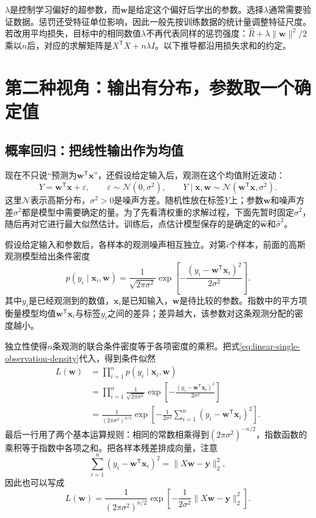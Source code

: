 $\lambda$是控制学习偏好的超参数，而$\bm w$是给定这个偏好后学出的参数。选择$\lambda$通常需要验证数据。惩罚还受特征单位影响，因此一般先按训练数据的统计量调整特征尺度。若改用平均损失，目标中的相同数值$\lambda$不再代表同样的惩罚强度：$\hat R+\lambda\|\bm w\|^2/2$乘以$n$后，对应的求解矩阵是$X^{\mathsf T}X+n\lambda I$。以下推导都沿用损失求和的约定。



\section{第二种视角：输出有分布，参数取一个确定值}
\subsection{概率回归：把线性输出作为均值}
现在不只说“预测为$\bm w^{\mathsf T}\bm x$”，还假设给定输入后，观测在这个均值附近波动：
\begin{equation}
 Y=\bm w^{\mathsf T}\bm x+\varepsilon,\qquad
 \varepsilon\sim\mathcal N(0,\sigma^2),\qquad
 Y\mid\bm x,\bm w\sim\mathcal N(\bm w^{\mathsf T}\bm x,\sigma^2).
\end{equation}
这里$\mathcal N$表示高斯分布，$\sigma^2>0$是噪声方差。随机性放在标签$Y$上；参数$\bm w$和噪声方差$\sigma^2$都是模型中需要确定的量。为了先看清权重的求解过程，下面先暂时固定$\sigma^2$，随后再对它进行最大似然估计。训练后，点估计模型保存的是确定的$\hat{\bm w}$和$\hat{\sigma}^2$。

假设给定输入和参数后，各样本的观测噪声相互独立。对第$i$个样本，前面的高斯观测模型给出条件密度
\begin{equation}
 p(y_i\mid\bm x_i,\bm w)
 =\frac{1}{\sqrt{2\pi\sigma^2}}
 \exp\left[-\frac{(y_i-\bm w^{\mathsf T}\bm x_i)^2}{2\sigma^2}\right].
 \label{eq:linear-single-observation-density}
\end{equation}
其中$y_i$是已经观测到的数值，$\bm x_i$是已知输入，$\bm w$是待比较的参数。指数中的平方项衡量模型均值$\bm w^{\mathsf T}\bm x_i$与标签$y_i$之间的差异；差异越大，该参数对这条观测分配的密度越小。

独立性使得$n$条观测的联合条件密度等于各项密度的乘积。把式\eqref{eq:linear-single-observation-density}代入，得到条件似然
\begin{align}
 L(\bm w)
 &=\prod_{i=1}^n p(y_i\mid\bm x_i,\bm w)\\
 &=\prod_{i=1}^n
 \frac{1}{\sqrt{2\pi\sigma^2}}
 \exp\left[-\frac{(y_i-\bm w^{\mathsf T}\bm x_i)^2}{2\sigma^2}\right]\\
 &=\frac{1}{(2\pi\sigma^2)^{n/2}}
 \exp\left[-\frac{1}{2\sigma^2}
 \sum_{i=1}^n(y_i-\bm w^{\mathsf T}\bm x_i)^2\right].
 \label{eq:linear-likelihood-expanded}
\end{align}
最后一行用了两个基本运算规则：相同的常数相乘得到$(2\pi\sigma^2)^{-n/2}$，指数函数的乘积等于指数中各项之和。把各样本残差排成向量，注意
\begin{equation}
 \sum_{i=1}^n(y_i-\bm w^{\mathsf T}\bm x_i)^2
 =\|X\bm w-\bm y\|_2^2,
\end{equation}
因此也可以写成
\begin{equation}
 L(\bm w)=\frac{1}{(2\pi\sigma^2)^{n/2}}
 \exp\left[-\frac{1}{2\sigma^2}
 \|X\bm w-\bm y\|_2^2\right].
 \end{equation}

